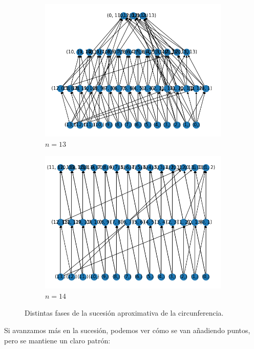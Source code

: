 \begin{figure}[h]
      \begin{subfigure}{.5\textwidth}
        \centering
        \includegraphics[width=.8\linewidth]{imagenes/13.png}
        \caption{$ n = 13 $}
      \end{subfigure}%
      \begin{subfigure}{.5\textwidth}
        \centering
        \includegraphics[width=.8\linewidth]{imagenes/14.png}
        \caption{$ n = 14 $}
      \end{subfigure}
    \caption{Distintas fases de la sucesión aproximativa de la circunferencia.}
    \label{circunferencia}
\end{figure}
\newpage
Si avanzamos más en la sucesión, podemos ver cómo se van a\~nadiendo puntos, pero se mantiene un claro patrón:
